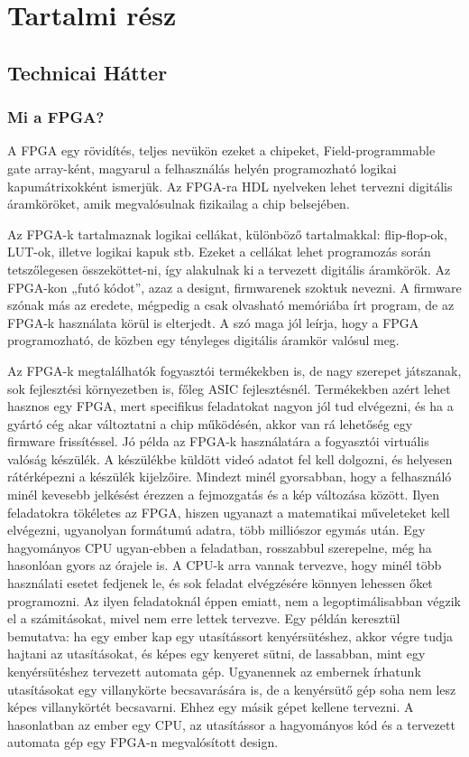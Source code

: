\documentclass[a4paper,12pt,oneside]{book}
\begin{document}
\chapter{Tartalmi rész}

\section{Technicai Hátter}
\subsection{Mi a FPGA?}

A FPGA egy rövidítés, teljes nevükön ezeket a chipeket, Field-programmable gate array-ként, magyarul a felhasználás helyén programozható logikai kapumátrixokként ismerjük. Az FPGA-ra HDL nyelveken lehet tervezni digitális áramköröket, amik megvalósulnak fizikailag a chip belsejében. 

Az FPGA-k tartalmaznak logikai cellákat, különböző tartalmakkal: flip-flop-ok, LUT-ok, illetve logikai kapuk stb. Ezeket a cellákat lehet programozás során tetszőlegesen összeköttet-ni, így alakulnak ki a tervezett digitális áramkörök. Az FPGA-kon „futó kódot”, azaz a designt, firmwarenek szoktuk nevezni. A firmware szónak más az eredete, mégpedig a csak olvasható memóriába írt program, de az FPGA-k használata körül is elterjedt. A szó maga jól leírja, hogy a FPGA programozható, de közben egy tényleges digitális áramkör valósul meg.

Az FPGA-k megtalálhatók fogyasztói termékekben is, de nagy szerepet játszanak, sok fejlesztési környezetben is, főleg ASIC fejlesztésnél. Termékekben azért lehet hasznos egy FPGA, mert specifikus feladatokat nagyon jól tud elvégezni, és ha a gyártó cég akar változtatni a chip működésén, akkor van rá lehetőség egy firmware frissítéssel. Jó példa az FPGA-k használatára a fogyasztói virtuális valóság készülék. A készülékbe küldött videó adatot fel kell dolgozni, és helyesen rátérképezni a készülék kijelzőire. Mindezt minél gyorsabban, hogy a felhasználó minél kevesebb jelkésést érezzen a fejmozgatás és a kép változása között. Ilyen feladatokra tökéletes az FPGA, hiszen ugyanazt a matematikai műveleteket kell elvégezni, ugyanolyan formátumú adatra, több milliószor egymás után. Egy hagyományos CPU ugyan-ebben a feladatban, rosszabbul szerepelne, még ha hasonlóan gyors az órajele is. A CPU-k arra vannak tervezve, hogy minél több használati esetet fedjenek le, és sok feladat elvégzésére könnyen lehessen őket programozni. Az ilyen feladatoknál éppen emiatt, nem a legoptimálisabban végzik el a számitásokat, mivel nem erre lettek tervezve. Egy példán keresztül bemutatva: ha egy ember kap egy utasítássort kenyérsütéshez, akkor végre tudja hajtani az utasításokat, és képes egy kenyeret sütni, de lassabban, mint egy kenyérsütéshez tervezett automata gép. Ugyanennek az embernek írhatunk utasításokat egy villanykörte becsavarására is, de a kenyérsütő gép soha nem lesz képes villanykörtét becsavarni. Ehhez egy másik gépet kellene tervezni. A hasonlatban az ember egy CPU, az utasítássor a hagyományos kód és a tervezett automata gép egy FPGA-n megvalósított design.
\end{document}
